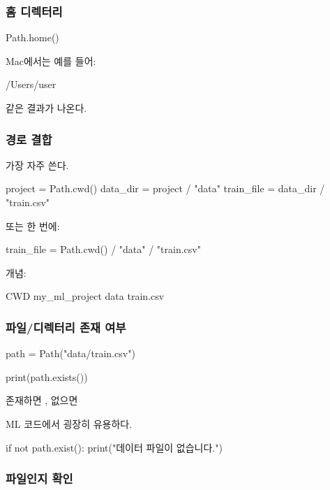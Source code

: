 \subsubsection{홈 디렉터리}

\begin{dhkcode}
Path.home()
\end{dhkcode}

Mac에서는 예를 들어:

\begin{dhkzsh}
/Users/user
\end{dhkzsh}

같은 결과가 나온다.

\subsubsection{경로 결합}

가장 자주 쓴다.

\begin{dhkcode}
project = Path.cwd()
data_dir = project / "data"
train_file = data_dir / "train.csv"
\end{dhkcode}

또는 한 번에:

\begin{dhkcode}
train_file = Path.cwd() / "data" / "train.csv"
\end{dhkcode}

개념:

\begin{dhksmry}[centered]
CWD
\da
my_ml_project
\da
data
\da
train.csv
\end{dhksmry}

\subsubsection{파일/디렉터리 존재 여부}

\begin{dhkcode}
path = Path("data/train.csv")

print(path.exists())
\end{dhkcode}

존재하면 , 없으면 

ML 코드에서 굉장히 유용하다.

\begin{dhkcode}
if not path.exist():
    print("데이터 파일이 없습니다.")
\end{dhkcode}

\subsubsection{파일인지 확인}

